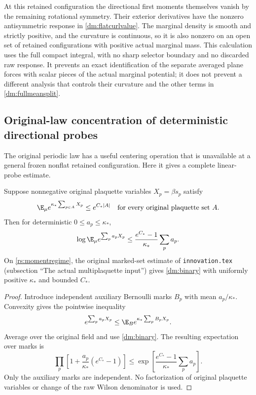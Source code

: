 At this retained configuration the directional first moments themselves vanish by the remaining rotational symmetry. Their exterior derivatives have the nonzero antisymmetric response in \eqref{dm:flatcurlvalue}. The marginal density is smooth and strictly positive, and the curvature is continuous, so it is also nonzero on an open set of retained configurations with positive actual marginal mass. This calculation uses the full compact integral, with no sharp selector boundary and no discarded raw response. It prevents an exact identification of the separate averaged plane forces with scalar pieces of the actual marginal potential; it does not prevent a different analysis that controls their curvature and the other terms in \eqref{dm:fullmeansplit}.

\subsection{Original-law concentration of deterministic directional probes}

The original periodic law has a useful centering operation that is unavailable at a general frozen nonflat retained configuration. Here it gives a complete linear-probe estimate.

\begin{lemma}
\label{dm:weighted}
Suppose nonnegative original plaquette variables \(X_p=\beta s_p\) satisfy
\begin{equation}
 \E_\mu e^{\kappa_*\sum_{p\in A}X_p}\le e^{C_*|A|}
 \quad\hbox{for every original plaquette set }A.
 \label{dm:binary}
\end{equation}
Then for deterministic \(0\le a_p\le\kappa_*\),
\begin{equation}
 \log\E_\mu e^{\sum_pa_pX_p}
 \le\frac{e^{C_*}-1}{\kappa_*}\sum_pa_p.
 \label{dm:weightedbound}
\end{equation}
On \eqref{rs:momentregime}, the original marked-set estimate of \texttt{innovation.tex} (subsection ``The actual multiplaquette input'') gives \eqref{dm:binary} with uniformly positive \(\kappa_*\) and bounded \(C_*\).
\end{lemma}
\begin{proof}
Introduce independent auxiliary Bernoulli marks \(B_p\) with mean \(a_p/\kappa_*\). Convexity gives the pointwise inequality
\[
 e^{\sum_pa_pX_p}
 \le\E_B e^{\kappa_*\sum_pB_pX_p}.
\]
Average over the original field and use \eqref{dm:binary}. The resulting expectation over marks is
\[
 \prod_p\left[1+\frac{a_p}{\kappa_*}(e^{C_*}-1)\right]
 \le\exp\left[\frac{e^{C_*}-1}{\kappa_*}\sum_pa_p\right].
\]
Only the auxiliary marks are independent. No factorization of original plaquette variables or change of the raw Wilson denominator is used.
\end{proof}

